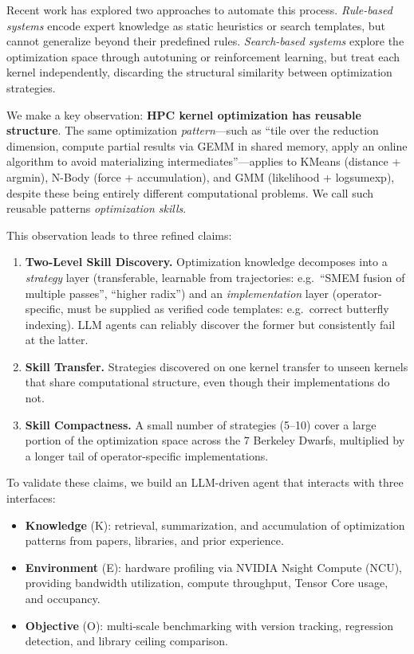 \documentclass[sigconf,nonacm]{acmart}
\begin{document}
Recent work has explored two approaches to automate this process. \emph{Rule-based systems} encode expert knowledge as static heuristics or search templates, but cannot generalize beyond their predefined rules. \emph{Search-based systems} explore the optimization space through autotuning or reinforcement learning, but treat each kernel independently, discarding the structural similarity between optimization strategies.

We make a key observation: \textbf{HPC kernel optimization has reusable structure}. The same optimization \emph{pattern}---such as ``tile over the reduction dimension, compute partial results via GEMM in shared memory, apply an online algorithm to avoid materializing intermediates''---applies to KMeans (distance + argmin), N-Body (force + accumulation), and GMM (likelihood + logsumexp), despite these being entirely different computational problems. We call such reusable patterns \emph{optimization skills}.

This observation leads to three refined claims:

\begin{enumerate}
    \item \textbf{Two-Level Skill Discovery.} Optimization knowledge
    decomposes into a \emph{strategy} layer (transferable, learnable
    from trajectories: e.g.\ ``SMEM fusion of multiple passes'',
    ``higher radix'') and an \emph{implementation} layer
    (operator-specific, must be supplied as verified code
    templates: e.g.\ correct butterfly indexing).
    LLM agents can reliably discover the former but consistently fail
    at the latter.
    \item \textbf{Skill Transfer.} Strategies discovered on one
    kernel transfer to unseen kernels that share computational
    structure, even though their implementations do not.
    \item \textbf{Skill Compactness.} A small number of strategies
    (5--10) cover a large portion of the optimization space across
    the 7 Berkeley Dwarfs, multiplied by a longer tail of
    operator-specific implementations.
\end{enumerate}

To validate these claims, we build an LLM-driven agent that interacts with three interfaces:
\begin{itemize}
    \item \textbf{Knowledge} (K): retrieval, summarization, and accumulation of optimization patterns from papers, libraries, and prior experience.
    \item \textbf{Environment} (E): hardware profiling via NVIDIA Nsight Compute (NCU), providing bandwidth utilization, compute throughput, Tensor Core usage, and occupancy.
    \item \textbf{Objective} (O): multi-scale benchmarking with version tracking, regression detection, and library ceiling comparison.
\end{itemize}
\end{document}
